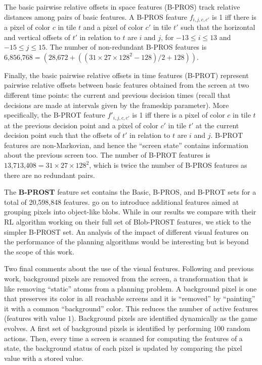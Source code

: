 \documentclass[letterpaper]{article}
\begin{document}
The basic pairwise relative offsets in space  features (B-PROS)
track relative distances among pairs of basic features.
A  B-PROS feature $f_{i,j,c,c'}$ is 1  iff there is a  pixel of color $c$ in tile $t$ and a pixel of color $c'$ in tile
$t'$ such that the horizontal and vertical offsets of  $t'$ in relation to $t$
are $i$ and $j$, for $-13 \leq i \leq 13$ and $-15 \leq j \leq 15$.
The number of non-redundant B-PROS features is
$\text{6,856,768} = (\text{28,672} + ((31 \times 27 \times 128^2 - 128)/2 + 128))$.

Finally, the basic pairwise relative  offsets in time    features (B-PROT)
represent pairwise relative offsets between basic  features obtained from the screen 
at two  different time points: the current and previous decision times (recall that decisions are made at  intervals given by the frameskip parameter).
More specifically,  the B-PROT feature $f'_{i,j,c,c'}$ is 1 iff  there is a  pixel of color $c$ in  tile $t$
at the previous decision point and  a pixel of color $c'$ in tile $t'$ at the current decision point
such that the offsets of $t'$ in relation to $t$  are $i$ and $j$. B-PROT features are non-Markovian,
and hence the ``screen state'' contains information about the previous screen too.
The number of B-PROT features is $\text{13,713,408} = 31\times27\times128^2$, which is twice the number of B-PROS features as there are no redundant pairs. 

The \textbf{B-PROST} feature set contains the Basic, B-PROS, and B-PROT sets for a total of
20,598,848 features. \citeauthor{shallow} go on to introduce additional features aimed at grouping pixels
into object-like blobs. While in our results we compare with their RL algorithm working on their
full set of  Blob-PROST features, we stick to the  simpler B-PROST set.
An  analysis of the impact of different visual features  on the performance of the
planning algorithms would be interesting but is beyond the scope of this work.

Two final comments about the use of the visual features. Following
\citeauthor{shallow} and previous work,  background pixels
are removed from the screen, a transformation that is like
removing ``static'' atoms from a planning problem.
A background pixel is one that preserves its color in all
reachable screens and it is ``removed'' by ``painting''
it with a common ``background''  color. This reduces the number
of active features (features with value $1$).
Background pixels are identified dynamically as the game
evolves. A first set of background pixels is identified by
performing 100 random actions. Then, every time a screen is
scanned for computing the features of a state, the background
status of each pixel is updated by comparing the pixel value
with a stored value.
\end{document}
